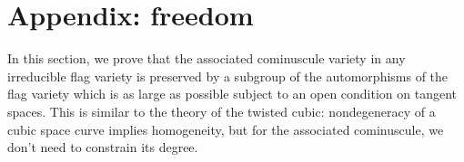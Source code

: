 \documentclass[a4paper,10pt]{amsart}
\newtheorem{lemma}{Lemma}
\theoremstyle{remark}
\begin{document}
%
%
%
%
%
%
%
%
\section{Appendix: freedom}
In this section, we prove that the associated cominuscule variety in any irreducible flag variety is preserved by a subgroup of the automorphisms of the flag variety which is as large as possible subject to an open condition on tangent spaces.
This is similar to the theory of the twisted cubic: nondegeneracy of a cubic space curve implies homogeneity, but for the associated cominuscule, we don't need to constrain its degree.
\end{document}
